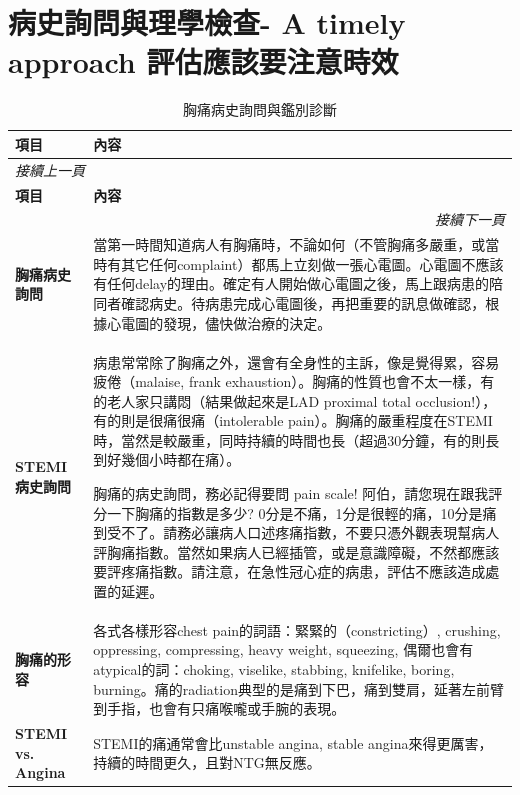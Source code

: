 \documentclass[fleqn,10pt,
paperheight=16cm, paperwidth=12cm,
includehead,%
nomarginpar,%
textwidth=10cm,%
headheight=25pt,%
]{wlscirep}
\begin{document}
\section{病史詢問與理學檢查- A timely approach 評估應該要注意時效}

\begin{longtable}{p{4cm} p{9cm}}
\caption{胸痛病史詢問與鑑別診斷}\\
\hline
\textbf{項目} & \textbf{內容} \\
\hline
\endfirsthead
\multicolumn{2}{l}{\textit{接續上一頁}} \\
\hline
\textbf{項目} & \textbf{內容} \\
\hline
\endhead
\hline \multicolumn{2}{r}{\textit{接續下一頁}} \\
\endfoot
\endlastfoot

\textbf{胸痛病史詢問} & 
當第一時間知道病人有胸痛時，不論如何（不管胸痛多嚴重，或當時有其它任何complaint）都馬上立刻做一張心電圖。心電圖不應該有任何delay的理由。確定有人開始做心電圖之後，馬上跟病患的陪同者確認病史。待病患完成心電圖後，再把重要的訊息做確認，根據心電圖的發現，儘快做治療的決定。\\ \hline

\textbf{STEMI病史詢問} & 
病患常常除了胸痛之外，還會有全身性的主訴，像是覺得累，容易疲倦（malaise, frank exhaustion）。胸痛的性質也會不太一樣，有的老人家只講悶（結果做起來是LAD proximal total occlusion!），有的則是很痛很痛（intolerable pain）。胸痛的嚴重程度在STEMI時，當然是較嚴重，同時持續的時間也長（超過30分鐘，有的則長到好幾個小時都在痛）。

胸痛的病史詢問，務必記得要問 pain scale! 阿伯，請您現在跟我評分一下胸痛的指數是多少? 0分是不痛，1分是很輕的痛，10分是痛到受不了。請務必讓病人口述疼痛指數，不要只憑外觀表現幫病人評胸痛指數。當然如果病人已經插管，或是意識障礙，不然都應該要評疼痛指數。請注意，在急性冠心症的病患，評估不應該造成處置的延遲。

\\ \hline

\textbf{胸痛的形容} & 
各式各樣形容chest pain的詞語：緊緊的（constricting）, crushing, oppressing, compressing, heavy weight, squeezing, 偶爾也會有atypical的詞：choking, viselike, stabbing, knifelike, boring, burning。痛的radiation典型的是痛到下巴，痛到雙肩，延著左前臂到手指，也會有只痛喉嚨或手腕的表現。\\ \hline

\textbf{STEMI vs. Angina} & 
STEMI的痛通常會比unstable angina, stable angina來得更厲害，持續的時間更久，且對NTG無反應。



\end{longtable}
\end{document}
